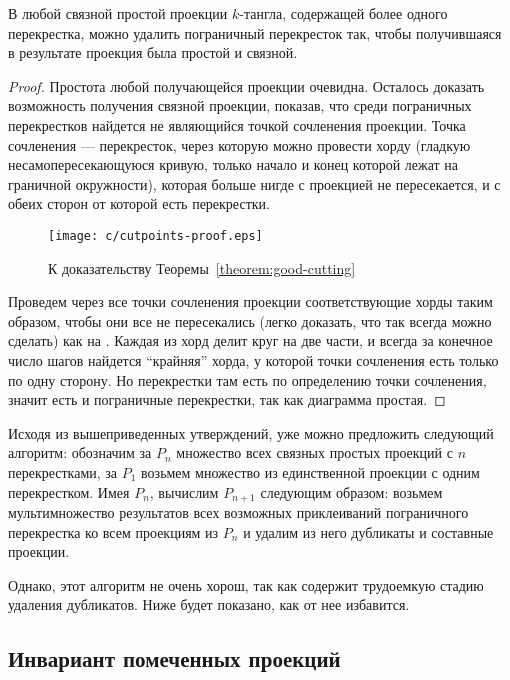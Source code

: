 		\begin{theorem}
			\label{theorem:good-cutting}
			В любой связной простой проекции $k$-тангла, содержащей более одного перекрестка, можно удалить пограничный
			перекресток так, чтобы получившаяся в результате проекция была простой и связной.
		\end{theorem}
		\begin{proof}
			Простота любой получающейся проекции очевидна. Осталось доказать возможность получения связной проекции, показав,
			что среди пограничных перекрестков найдется не являющийся точкой сочленения проекции. Точка сочленения --- перекресток,
			через которую можно провести хорду (гладкую несамопересекающуюся кривую, только начало и конец которой лежат на граничной
			окружности), которая больше нигде с проекцией не пересекается, и с обеих сторон от которой есть перекрестки.
			\begin{figure}[H]
				\centering
				\texttt{[image: c/cutpoints-proof.eps]}
				\caption{К доказательству Теоремы~\ref{theorem:good-cutting}\label{figure:cutpoints-proof}}
			\end{figure}
			Проведем через все точки сочленения проекции соответствующие хорды таким образом, чтобы они все не пересекались
			(легко доказать, что так всегда можно сделать) как на . Каждая из хорд
			делит круг на две части, и всегда за конечное число шагов найдется ``крайняя'' хорда, у которой точки сочленения
			есть только по одну сторону. Но перекрестки там есть по определению точки сочленения, значит есть и пограничные
			перекрестки, так как диаграмма простая.
		\end{proof}

		Исходя из вышеприведенных утверждений, уже можно предложить следующий алгоритм: обозначим за $P_n$ множество всех
		связных простых проекций с $n$ перекрестками, за $P_1$ возьмем множество из единственной проекции с одним перекрестком.
		Имея $P_n$, вычислим $P_{n+1}$ следующим образом: возьмем мультимножество результатов всех возможных приклеиваний
		пограничного перекрестка ко всем проекциям из $P_n$ и удалим из него дубликаты и составные проекции.

		Однако, этот алгоритм не очень хорош, так как содержит трудоемкую стадию удаления дубликатов. Ниже будет показано, как
		от нее избавится.

	\subsection{Инвариант помеченных проекций}
		\label{subsection:root-code}

